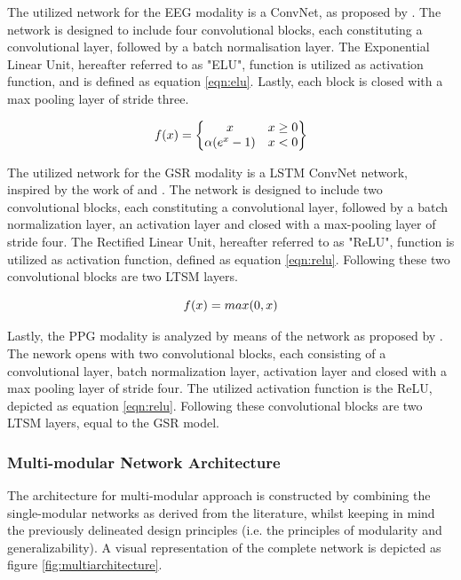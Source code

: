 \documentclass[12pt]{article}
\begin{document}
The utilized network for the EEG modality is a ConvNet, as proposed by . The network is designed to include four convolutional blocks, each constituting a convolutional layer, followed by a batch normalisation layer. The Exponential Linear Unit, hereafter referred to as "ELU", function is utilized as activation function, and is defined as equation \ref{eqn:elu}. Lastly, each block is closed with a max pooling layer of stride three.

\begin{equation}
\label{eqn:elu}
f(x)= 
\begin{Bmatrix}
x & x \geq0 \\ 
\alpha (e^x -1) & x<0
\end{Bmatrix}
\bigskip
\end{equation}

The utilized network for the GSR modality is a LSTM ConvNet network, inspired by the work of  and  . The network is designed to include two convolutional blocks, each constituting a convolutional layer, followed by a batch normalization layer, an activation layer and closed with a max-pooling layer of stride four. The Rectified Linear Unit, hereafter referred to as "ReLU", function is utilized as activation function, defined as equation \ref{eqn:relu}. Following these two convolutional blocks are two LTSM layers.

\begin{equation} 
\label{eqn:relu}
f(x)=max(0,x)
\bigskip
\end{equation}

Lastly, the PPG modality is analyzed by means of the network as proposed by . The nework opens with two convolutional blocks, each consisting of a convolutional layer, batch normalization layer, activation layer and closed with a max pooling layer of stride four. The utilized activation function is the ReLU, depicted as equation \ref{eqn:relu}. Following these convolutional blocks are two LTSM layers, equal to the GSR model. 

\subsubsection{Multi-modular Network Architecture}
The architecture for multi-modular approach is constructed by combining the single-modular networks as derived from the literature, whilst keeping in mind the previously delineated design principles (i.e. the principles of modularity and generalizability). A visual representation of the complete network is depicted as figure \ref{fig:multiarchitecture}.
\end{document}
